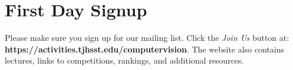 \documentclass{article}
\begin{document}
\section{First Day Signup}
Please make sure you sign up for our mailing list. Click the \textit{Join Us} button at: \\ \textbf{https://activities.tjhsst.edu/computervision}. The website also contains lectures, links to competitions, rankings, and additional resources.  

      
\end{document}
